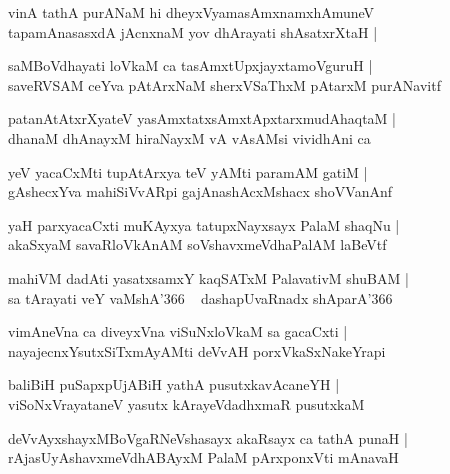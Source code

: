 \documentclass[twoside,12pt,openright]{book}
\newcounter{shloka}[chapter]
\begin{document}
\begin{shloka}%
vinA tathA purANaM hi dheyxVyamasAmxnamxhAmuneV \\
tapamAnasasxdA jAcnxnaM yov dhArayati shAsatxrXtaH |\\
\end{shloka}

\begin{shloka}%
saMBoVdhayati loVkaM ca tasAmxtUpxjayxtamoVguruH |\\
saveRVSAM ceYva pAtArxNaM sherxVSaThxM pAtarxM purANavitf
\end{shloka}

\begin{shloka}%
patanAtAtxrXyateV yasAmxtatxsAmxtApxtarxmudAhaqtaM |\\
dhanaM dhAnayxM hiraNayxM vA vAsAMsi vividhAni ca 
\end{shloka}

\begin{shloka}%
yeV yacaCxMti tupAtArxya teV yAMti paramAM gatiM |\\
gAshecxYva mahiSiVvARpi gajAnashAcxMshacx shoVVanAnf
\end{shloka}

\begin{shloka}%
yaH parxyacaCxti muKAyxya tatupxNayxsayx PalaM shaqNu |\\
akaSxyaM savaRloVkAnAM soVshavxmeVdhaPalAM laBeVtf
\end{shloka}

\begin{shloka}%
mahiVM dadAti yasatxsamxY kaqSATxM PalavativM shuBAM |\\
sa tArayati veY vaMshA\char'366 ~ dashapUvaRnadx shAparA\char'366 
\end{shloka}

\begin{shloka}%
vimAneVna ca diveyxVna viSuNxloVkaM sa gacaCxti |\\
nayajecnxYsutxSiTxmAyAMti deVvAH porxVkaSxNakeYrapi
\end{shloka}

\begin{shloka}%
baliBiH puSapxpUjABiH yathA pusutxkavAcaneYH |\\
viSoNxVrayataneV yasutx kArayeVdadhxmaR pusutxkaM 
\end{shloka}

\begin{shloka}%
deVvAyxshayxMBoVgaRNeVshasayx akaRsayx ca tathA punaH |\\
rAjasUyAshavxmeVdhABAyxM PalaM pArxponxVti mAnavaH 
\end{shloka}
\end{document}
